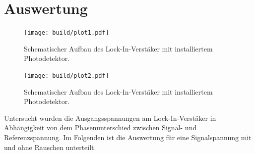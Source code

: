 \section{Auswertung}
\begin{figure}
    \centering
    \texttt{[image: build/plot1.pdf]}
    \caption{Schematischer Aufbau des Lock-In-Verstäker mit installiertem Photodetektor. \cite{skript}} 
    \label{fig:licht}
\end{figure}

\begin{figure}
    \centering
    \texttt{[image: build/plot2.pdf]}
    \caption{Schematischer Aufbau des Lock-In-Verstäker mit installiertem Photodetektor. \cite{skript}} 
    \label{fig:licht2}
\end{figure}
Untersucht wurden die Ausgangsspannungen am Lock-In-Verstäker in Abhängigkeit von dem Phasenunterschied zwischen Signal- und Referenzspannung. Im Folgenden ist die Auswertung 
für eine Signalspannung mit und ohne Rauschen unterteilt.

